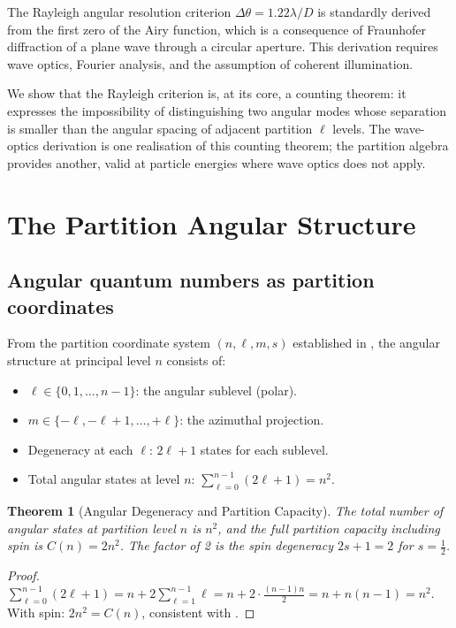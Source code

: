 \documentclass[twocolumn,10pt,a4paper]{article}
\theoremstyle{thmstyle}
\newtheorem{theorem}{Theorem}[section]
\theoremstyle{definition}
\theoremstyle{remark}
\begin{document}
The Rayleigh angular resolution criterion $\Delta\theta = 1.22\lambda/D$
is standardly derived from the first zero of the Airy function, which
is a consequence of Fraunhofer diffraction of a plane wave through a
circular aperture. This derivation requires wave optics, Fourier
analysis, and the assumption of coherent illumination.

We show that the Rayleigh criterion is, at its core, a counting theorem:
it expresses the impossibility of distinguishing two angular modes whose
separation is smaller than the angular spacing of adjacent partition
$\ell$ levels. The wave-optics derivation is one realisation of this
counting theorem; the partition algebra provides another, valid at
particle energies where wave optics does not apply.

\section{The Partition Angular Structure}
\label{sec:angular_structure}

\subsection{Angular quantum numbers as partition coordinates}

From the partition coordinate system $(n, \ell, m, s)$ established
in \citet{companion:math}, the angular structure at principal level $n$
consists of:
\begin{itemize}[nosep]
\item $\ell \in \{0, 1, \ldots, n-1\}$: the angular sublevel (polar).
\item $m \in \{-\ell, -\ell+1, \ldots, +\ell\}$: the azimuthal projection.
\item Degeneracy at each $\ell$: $2\ell + 1$ states for each sublevel.
\item Total angular states at level $n$: $\sum_{\ell=0}^{n-1}(2\ell+1) = n^2$.
\end{itemize}

\begin{theorem}[Angular Degeneracy and Partition Capacity]
\label{thm:degeneracy}
The total number of angular states at partition level $n$ is $n^2$,
and the full partition capacity including spin is $C(n) = 2n^2$.
The factor of 2 is the spin degeneracy $2s+1 = 2$ for $s = \tfrac{1}{2}$.
\end{theorem}

\begin{proof}
$\sum_{\ell=0}^{n-1}(2\ell+1) = n + 2\sum_{\ell=1}^{n-1}\ell
= n + 2\cdot\tfrac{(n-1)n}{2} = n + n(n-1) = n^2$.
With spin: $2n^2 = C(n)$, consistent with \citet{companion:math}.
\end{proof}
\end{document}
